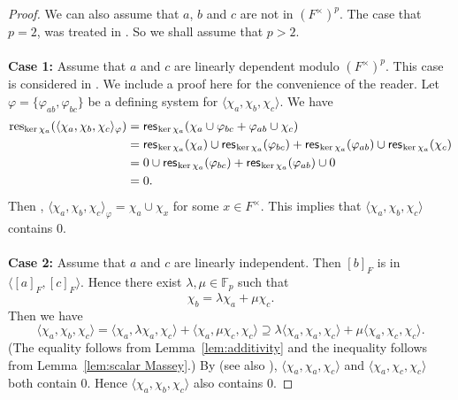 \documentclass[12pt,leqno]{amsart}
\theoremstyle{plain}
\theoremstyle{definition}
\newcommand{\F}{{\mathbb F}}
\newcommand{\res}{{\text{\sf res}\hspace{.1ex} }}
\begin{document}
\begin{proof}
We can also assume that $a$, $b$ and $c$ are not in $(F^\times)^p$. The case that $p=2$, was treated in \cite{MT1}. So we shall assume that $p>2$.
\\
\\
{\bf Case 1:} Assume that $a$ and $c$ are linearly dependent modulo $(F^\times)^p$. This case is considered in \cite[Proof of Theorem 4.10]{MT5}. We include a proof here for the convenience of the reader. Let $\varphi=\{\varphi_{ab},\varphi_{bc}\}$ be a defining system for $\langle \chi_a,\chi_b,\chi_c\rangle$. We have
\[
\begin{aligned}
{\rm res}_{\ker \chi_a}(\langle \chi_a,\chi_b,\chi_c\rangle_\varphi)&= \res_{\ker\chi_a}(\chi_a\cup \varphi_{bc}+\varphi_{ab}\cup\chi_c )\\
&= \res_{\ker\chi_a}(\chi_a)\cup \res_{\ker\chi_a}(\varphi_{bc})+ \res_{\ker\chi_a}(\varphi_{ab})\cup\res_{\ker\chi_a}(\chi_c)\\
&= 0\cup \res_{\ker\chi_a}(\varphi_{bc})+ \res_{\ker\chi_a}(\varphi_{ab})\cup 0\\
& = 0.
\end{aligned}
\]
Then \cite[Chapter XIV, Proposition 2]{Se}, $\langle \chi_a,\chi_b,\chi_c\rangle_\varphi=\chi_a\cup\chi_x$ for some $x\in F^\times$. This implies that $\langle \chi_a,\chi_b,\chi_c\rangle$ contains 0.
 \\
\\
{\bf Case 2:} Assume that $a$ and $c$ are linearly independent. Then $[b]_F$ is in $\langle [a]_F,[c]_F\rangle$. Hence there exist $\lambda,\mu\in \F_p$ such that
\[
\chi_b = \lambda\chi_a +\mu\chi_c.
\]
Then we have
\[
\langle \chi_a,\chi_b,\chi_c\rangle = \langle \chi_a,\lambda\chi_a,\chi_c\rangle  +\langle \chi_a,\mu\chi_c,\chi_c\rangle \supseteq  \lambda \langle \chi_a,\chi_a,\chi_c\rangle  +\mu \langle \chi_a,\chi_c,\chi_c\rangle.
\]
(The equality follows from Lemma~\ref{lem:additivity} and the inequality follows from Lemma~\ref{lem:scalar Massey}.) By \cite[Theorem 5.9]{MT5} (see also \cite[Proof of Theorem 4.10, Case 2]{MT5}), $\langle \chi_a,\chi_a,\chi_c\rangle$ and $\langle \chi_a,\chi_c,\chi_c\rangle$ both contain 0. Hence $\langle \chi_a,\chi_b,\chi_c\rangle$ also contains 0.
\end{proof}
\end{document}
